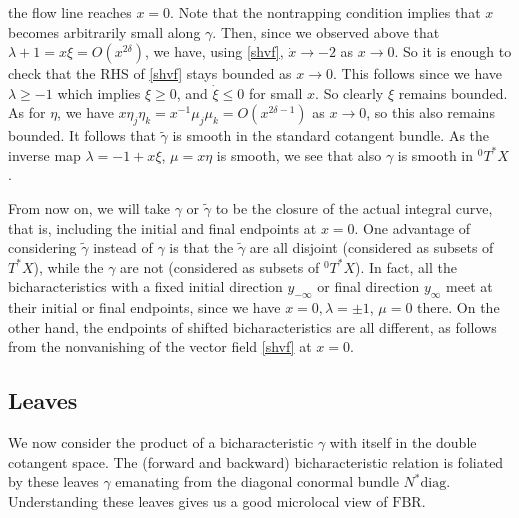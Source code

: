 \documentclass[10pt, a4paper, twoside]{amsart}
\numberwithin{equation}{section}
\theoremstyle{remark}
\begin{document}
the flow line reaches $x=0$. Note that the nontrapping condition implies that $x$ becomes arbitrarily small along $\gamma$. Then, since we observed above that $\lambda + 1 = x\xi = O(x^{2\delta})$, we have, using \eqref{shvf}, $\dot x \to -2$ as $x \to 0$. So it is enough to check that the RHS of \eqref{shvf} stays bounded as $x \to 0$. This follows since we have $\lambda \geq -1$ which implies $\xi \geq 0$,  and $\dot \xi \leq 0$ for small $x$. So clearly $\xi$ remains bounded. As for $\eta$, we have $x \eta_j \eta_k= x^{-1} \mu_j \mu_k = O(x^{2\delta - 1})$ as $x \to 0$, so this also remains bounded. It follows that ${\tilde \gamma}$ is smooth in the standard cotangent bundle. As the inverse map $\lambda = -1 + x\xi$, $\mu = x \eta$ is smooth, we see that also $\gamma$ is smooth in ${}^0 T^* X$.

From now on, we will take $\gamma$ or ${\tilde \gamma}$ to be the closure of the actual integral curve, that is, including the initial and final endpoints at $x = 0$.
One advantage of considering ${\tilde \gamma}$ instead of $\gamma$ is that the ${\tilde \gamma}$ are all disjoint (considered as subsets of $T^*X$), while the $\gamma$ are not (considered as subsets of ${}^0 T^* X$). In fact, all the bicharacteristics with a fixed initial direction $y_{-\infty}$ or final direction $y_\infty$ meet at their initial or final endpoints, since we have $x=0, \lambda = \pm 1$, $\mu = 0$ there. On the other hand, the endpoints of shifted bicharacteristics are all different, as follows from the nonvanishing of the vector field \eqref{shvf} at $x=0$.

\subsection{Leaves}\label{subsec:leaves}

We now consider the product of a bicharacteristic $\gamma$ with itself in the double cotangent space. The (forward and backward) bicharacteristic relation is  foliated by these leaves $\gamma$ emanating from the diagonal conormal bundle $N^* {\mathrm{diag}}$. Understanding these leaves gives us a good microlocal view of ${\mathrm{FBR}}$.
\end{document}
